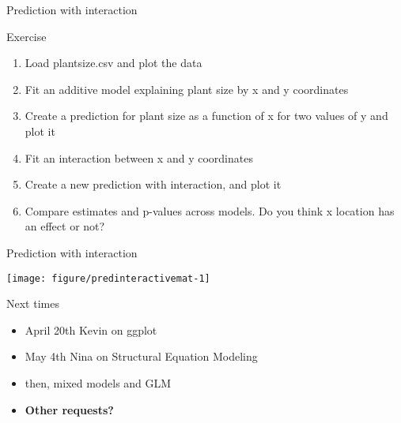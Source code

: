 \documentclass[10pt]{beamer}\usepackage[]{graphicx}\usepackage[]{color}
\newenvironment{knitrout}{}{} %
\begin{document}
\begin{frame}[fragile]{Prediction with interaction}
  \begin{exampleblock}{Exercise}
    \begin{enumerate}
      \item Load plantsize.csv and plot the data
      \item Fit an additive model explaining plant size by x and y coordinates
     \item Create a prediction for plant size as a function of x for two values of y and plot it
     \item Fit an interaction between x and y coordinates
     \item Create a new prediction with interaction, and plot it
     \item Compare estimates and p-values across models. Do you think x location has an effect or not?
    \end{enumerate}
  \end{exampleblock}
\end{frame}

  \begin{frame}[fragile]{Prediction with interaction}

\begin{knitrout}\small
{}\color{fgcolor}
\texttt{[image: figure/predinteractivemat-1]} 

\end{knitrout}

\end{frame}

\begin{frame}{Next times}
  \begin{itemize}
    \item April 20th Kevin on ggplot
    \item May 4th Nina on Structural Equation Modeling
    \item then, mixed models and GLM
    \item \textbf{Other requests?}
  \end{itemize}
\end{frame}
\end{document}
